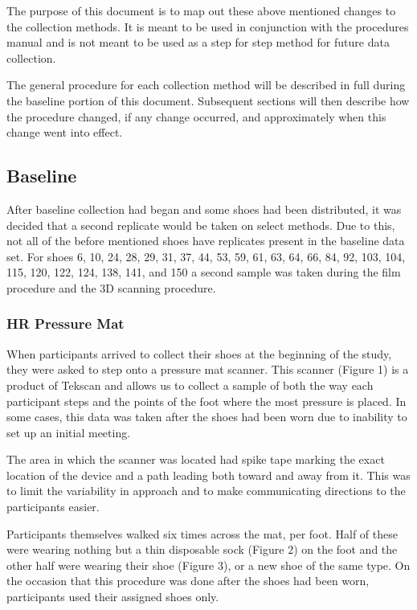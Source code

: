 The purpose of this document is to map out these above mentioned changes to the collection methods. It is meant to be used in conjunction with the procedures manual and is not meant to be used as a step for step method for future data collection.  

The general procedure for each collection method will be described in full during the baseline portion of this document. Subsequent sections will then describe how the procedure changed, if any change occurred, and approximately when this change went into effect. 

\newpage

\subsection{Baseline}
After baseline collection had began and some shoes had been distributed, it was decided that a second replicate would be taken on select methods. Due to this, not all of the before mentioned shoes have replicates present in the baseline data set. 
   For shoes 6, 10, 24, 28, 29, 31, 37, 44, 53, 59, 61, 63, 64, 66, 84, 92, 103, 104, 115, 120, 122, 124, 138, 141, and 150 a second sample was taken during the film procedure and the 3D scanning procedure. 


\subsubsection{HR Pressure Mat}

 When participants arrived to collect their shoes at the beginning of the study, they were asked to step onto a pressure mat scanner. This scanner (Figure 1) is a product of Tekscan and allows us to collect a sample of both the way each participant steps and the points of the foot where the most pressure is placed. In some cases, this data was taken after the shoes had been worn due to inability to set up an initial meeting. 
   
   The area in which the scanner was located had spike tape marking the exact location of the device and a path leading both toward and away from it. This was to limit the variability in approach and to make communicating directions to the participants easier. 
   
   Participants themselves walked six times across the mat, per foot. Half of these were wearing nothing but a thin disposable sock (Figure 2) on the foot and the other half were wearing their shoe (Figure 3), or a new shoe of the same type. On the occasion that this procedure was done after the shoes had been worn, participants used their assigned shoes only. 
   
